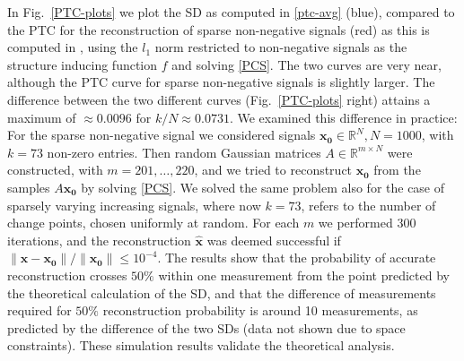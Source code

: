 \documentclass[11pt]{article}
\begin{document}
 In Fig.~\ref{PTC-plots} we plot the SD as computed in \eqref{ptc-avg} (blue), compared to the PTC for the reconstruction of sparse non-negative signals (red) as this is computed in \cite{DMM09}, using the $l_1$ norm restricted to non-negative signals as the structure inducing function $f$ and solving \eqref{PCS}. The two curves are very near, although the PTC curve for sparse non-negative signals is slightly larger. The difference between the two different curves (Fig.~\ref{PTC-plots} right) attains a maximum of $\approx0.0096$ for $k/N \approx 0.0731$. %
 We examined this difference in practice: 
 For the sparse non-negative signal we considered signals $\bm{x_0}\in\mathbb{R}^N, N = 1000$, with $k=73$ non-zero entries. Then random Gaussian matrices $A\in\mathbb{R}^{m\times N}$ were constructed, with $m=201,\ldots,220$, and we tried to reconstruct $\bm{x_0}$ from the samples $A\bm{x_0}$ by solving \eqref{PCS}. We solved the same problem also for the case of sparsely varying increasing signals, where now $k=73$, refers to the number of change points, chosen uniformly at random. For each $m$ we performed 300 iterations, and the reconstruction $\hat{\bm{x}}$ was deemed successful if $\|\hat{\bm{x}} - \bm{x_0}\|/\|\bm{x_0}\| \leq 10^{-4}$. The results show that the probability of accurate reconstruction crosses $50\%$ within one measurement from the point predicted by the theoretical calculation of the SD, and that the difference of measurements required for $50\%$ reconstruction probability is around 10 measurements, as predicted by the difference of the two SDs (data not shown due to space constraints). These simulation results validate the theoretical analysis.
\end{document}
